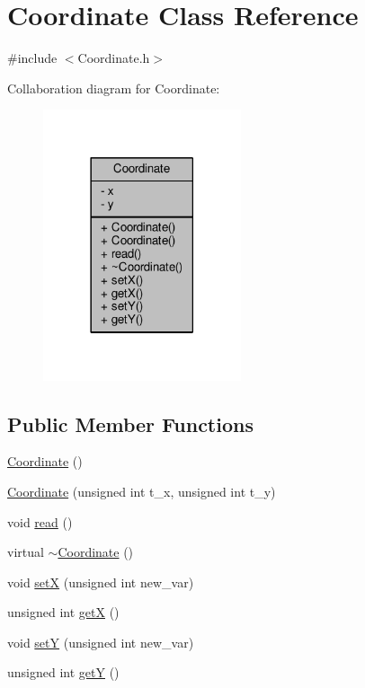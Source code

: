 \hypertarget{class_coordinate}{}\section{Coordinate Class Reference}
\label{class_coordinate}


{\ttfamily \#include $<$Coordinate.\+h$>$}



Collaboration diagram for Coordinate\+:\nopagebreak
\begin{figure}[H]
\begin{center}
\leavevmode
\includegraphics[width=165pt]{class_coordinate__coll__graph}
\end{center}
\end{figure}
\subsection*{Public Member Functions}
\begin{DoxyCompactItemize}
\item 
\hyperlink{class_coordinate_aac6f323a685fc1e88fbea9c86f1e600d}{Coordinate} ()
\item 
\hyperlink{class_coordinate_a8851ee18948f8b6433b0afc6b59095a7}{Coordinate} (unsigned int t\+\_\+x, unsigned int t\+\_\+y)
\item 
void \hyperlink{class_coordinate_a7a332d39b84136f15e8d3565b3c235f0}{read} ()
\item 
virtual \hyperlink{class_coordinate_ac57d6eb147832a234cc5deaff8c94346}{$\sim$\+Coordinate} ()
\item 
void \hyperlink{class_coordinate_a330c37af7bb87f30a55173617112eade}{setX} (unsigned int new\+\_\+var)
\item 
unsigned int \hyperlink{class_coordinate_a590d96a9210bc7c63854c88f8641dce8}{getX} ()
\item 
void \hyperlink{class_coordinate_ad4b804672ac33f50024d66f3bb46e033}{setY} (unsigned int new\+\_\+var)
\item 
unsigned int \hyperlink{class_coordinate_aafb7d8a5075196ba89e2cb8d70405a1c}{getY} ()
\end{DoxyCompactItemize}
